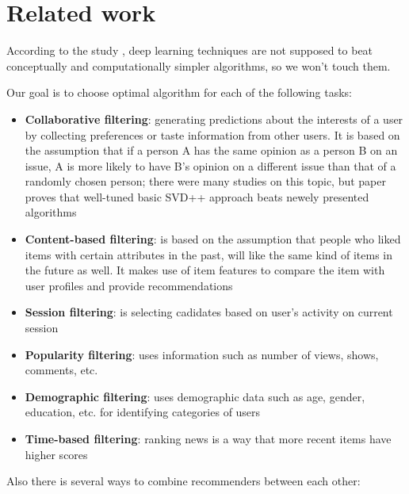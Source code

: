 \documentclass{article}
\begin{document}
\section{Related work}
\label{sec:related}

According to the study \citep{progress}, deep learning techniques are not supposed to beat conceptually and computationally simpler algorithms, so we won't touch them.

Our goal is to choose optimal algorithm for each of the following tasks:

\begin{itemize}
    \item \textbf{Collaborative filtering}: generating predictions about the interests of a user by collecting preferences or taste information from other users. It is based on the assumption that if a person A has the same opinion as a person B on an issue, A is more likely to have B's opinion on a different issue than that of a randomly chosen person; there were many studies on this topic, but paper \citep{evaluation} proves that well-tuned basic SVD++ approach beats newely presented algorithms
    \item \textbf{Content-based filtering}: is based on the assumption that people who liked items with certain attributes in the past, will like the same kind of items in the future as well. It makes use of item features to compare the item with user profiles and provide recommendations
    \item \textbf{Session filtering}: is selecting cadidates based on user's activity on current session
    \item \textbf{Popularity filtering}: uses information such as number of views, shows, comments, etc.
    \item \textbf{Demographic filtering}: uses demographic data such as age, gender, education, etc. for identifying categories of users
    \item \textbf{Time-based filtering}: ranking news is a way that more recent items have higher scores
\end{itemize}

Also there is several ways \citep{survey1} to combine recommenders between each other:
\end{document}
